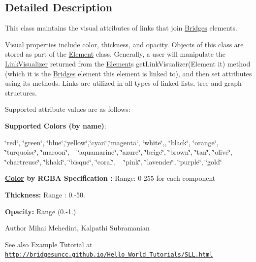 \subsection{Detailed Description}
This class maintains the visual attributes of links that join \hyperlink{namespace_bridges_1_1_bridges}{Bridges} elements. 

Visual properties include color, thickness, and opacity. Objects of this class are stored as part of the \hyperlink{namespace_bridges_1_1_element}{Element} class. Generally, a user will manipulate the \hyperlink{class_bridges_1_1_link_visualizer_1_1_link_visualizer}{Link\+Visualizer} returned from the \hyperlink{namespace_bridges_1_1_element}{Element}\textquotesingle{}s get\+Link\+Visualizer(\+Element it) method (which it is the \hyperlink{namespace_bridges_1_1_bridges}{Bridges} element this element is linked to), and then set attributes using its methods. Links are utilized in all types of linked lists, tree and graph structures.

Supported attribute values are as follows\+:

{\bfseries Supported Colors (by name)}\+: 

\char`\"{}red\char`\"{}, \char`\"{}green\char`\"{}, \char`\"{}blue\char`\"{},\char`\"{}yellow\char`\"{},\char`\"{}cyan\char`\"{},\char`\"{}magenta\char`\"{}, \char`\"{}white\char`\"{},, \char`\"{}black\char`\"{}, \char`\"{}orange\char`\"{}, \char`\"{}turquoise\char`\"{}, \char`\"{}maroon\char`\"{}, ~\newline
 \char`\"{}aquamarine\char`\"{}, \char`\"{}azure\char`\"{}, \char`\"{}beige\char`\"{}, \char`\"{}brown\char`\"{}, \char`\"{}tan\char`\"{}, \char`\"{}olive\char`\"{}, \char`\"{}chartreuse\char`\"{}, \char`\"{}khaki\char`\"{}, \char`\"{}bisque\char`\"{}, \char`\"{}coral\char`\"{}, ~\newline
 \char`\"{}pink\char`\"{}, \char`\"{}lavender\char`\"{}, \char`\"{}purple\char`\"{}, \char`\"{}gold\char`\"{} 

{\bfseries  \hyperlink{namespace_bridges_1_1_color}{Color} by R\+G\+B\+A Specification \+:} Range\+: 0-\/255 for each component 

{\bfseries  Thickness\+: } Range \+: 0.-\/50.

{\bfseries  Opacity\+: } Range (0.-\/1.) 

\begin{DoxyAuthor}{Author}
Mihai Mehedint, Kalpathi Subramanian
\end{DoxyAuthor}
\begin{DoxySeeAlso}{See also}
Example Tutorial at ~\newline
 \href{http://bridgesuncc.github.io/Hello_World_Tutorials/SLL.html}{\tt http\+://bridgesuncc.\+github.\+io/\+Hello\+\_\+\+World\+\_\+\+Tutorials/\+S\+L\+L.\+html} 
\end{DoxySeeAlso}


